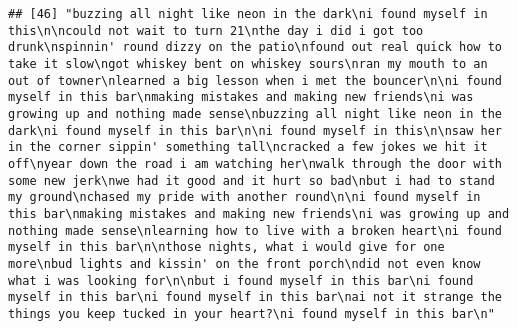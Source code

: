 \documentclass[]{article}
\begin{document}
\begin{verbatim}
## [46] "buzzing all night like neon in the dark\ni found myself in this\n\ncould not wait to turn 21\nthe day i did i got too drunk\nspinnin' round dizzy on the patio\nfound out real quick how to take it slow\ngot whiskey bent on whiskey sours\nran my mouth to an out of towner\nlearned a big lesson when i met the bouncer\n\ni found myself in this bar\nmaking mistakes and making new friends\ni was growing up and nothing made sense\nbuzzing all night like neon in the dark\ni found myself in this bar\n\ni found myself in this\n\nsaw her in the corner sippin' something tall\ncracked a few jokes we hit it off\nyear down the road i am watching her\nwalk through the door with some new jerk\nwe had it good and it hurt so bad\nbut i had to stand my ground\nchased my pride with another round\n\ni found myself in this bar\nmaking mistakes and making new friends\ni was growing up and nothing made sense\nlearning how to live with a broken heart\ni found myself in this bar\n\nthose nights, what i would give for one more\nbud lights and kissin' on the front porch\ndid not even know what i was looking for\n\nbut i found myself in this bar\ni found myself in this bar\ni found myself in this bar\nai not it strange the things you keep tucked in your heart?\ni found myself in this bar\n"                                                                                                                                                                                                                                                                                                                                                                                                                                                                                                                                                                                                                                                                                                                                                                                                                                                                                                                                                                                                                                                                                                                                                                                                                                                                                                                                                                                                                                                                                                                                                                                                                                                  

\end{verbatim}
\end{document}
